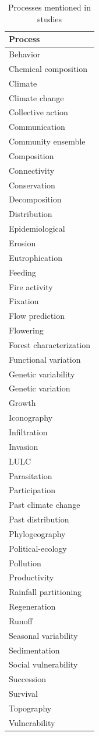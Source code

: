 \documentclass[]{article}
\begin{document}
\begin{table}

\caption{\label{tab:tabProcess}Processes mentioned in studies}
\centering
\begin{tabular}[t]{l}
\toprule
Process\\
\midrule
Behavior\\
Chemical composition\\
Climate\\
Climate change\\
Collective action\\
\addlinespace
Communication\\
Community ensemble\\
Composition\\
Connectivity\\
Conservation\\
\addlinespace
Decomposition\\
Distribution\\
Epidemiological\\
Erosion\\
Eutrophication\\
\addlinespace
Feeding\\
Fire activity\\
Fixation\\
Flow prediction\\
Flowering\\
\addlinespace
Forest characterization\\
Functional variation\\
Genetic variability\\
Genetic variation\\
Growth\\
\addlinespace
Iconography\\
Infiltration\\
Invasion\\
LULC\\
Parasitation\\
\addlinespace
Participation\\
Past climate change\\
Past distribution\\
Phylogeography\\
Political-ecology\\
\addlinespace
Pollution\\
Productivity\\
Rainfall partitioning\\
Regeneration\\
Runoff\\
\addlinespace
Seasonal variability\\
Sedimentation\\
Social vulnerability\\
Succession\\
Survival\\
\addlinespace
Topography\\
Vulnerability\\
\bottomrule
\end{tabular}
\end{table}
\end{document}
